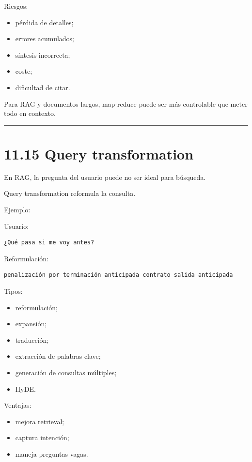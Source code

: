 Riesgos:

\begin{itemize}
\tightlist
\item
  pérdida de detalles;
\item
  errores acumulados;
\item
  síntesis incorrecta;
\item
  coste;
\item
  dificultad de citar.
\end{itemize}

Para RAG y documentos largos, map-reduce puede ser más controlable que
meter todo en contexto.

\begin{center}\rule{0.5\linewidth}{0.5pt}\end{center}

\section{11.15 Query transformation}\label{query-transformation}

En RAG, la pregunta del usuario puede no ser ideal para búsqueda.

Query transformation reformula la consulta.

Ejemplo:

Usuario:

\begin{lstlisting}
¿Qué pasa si me voy antes?
\end{lstlisting}

Reformulación:

\begin{lstlisting}
penalización por terminación anticipada contrato salida anticipada
\end{lstlisting}

Tipos:

\begin{itemize}
\tightlist
\item
  reformulación;
\item
  expansión;
\item
  traducción;
\item
  extracción de palabras clave;
\item
  generación de consultas múltiples;
\item
  HyDE.
\end{itemize}

Ventajas:

\begin{itemize}
\tightlist
\item
  mejora retrieval;
\item
  captura intención;
\item
  maneja preguntas vagas.
\end{itemize}

